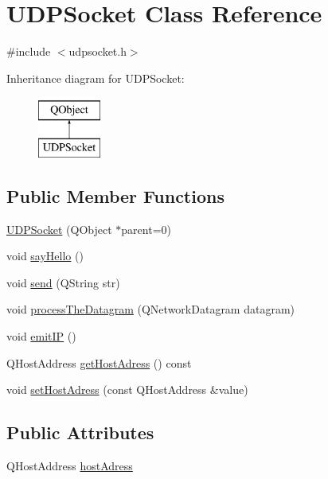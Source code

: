 \hypertarget{class_u_d_p_socket}{}\section{U\+D\+P\+Socket Class Reference}
\label{class_u_d_p_socket}


{\ttfamily \#include $<$udpsocket.\+h$>$}

Inheritance diagram for U\+D\+P\+Socket\+:\begin{figure}[H]
\begin{center}
\leavevmode
\includegraphics[height=2.000000cm]{class_u_d_p_socket}
\end{center}
\end{figure}
\subsection*{Public Member Functions}
\begin{DoxyCompactItemize}
\item 
\hyperlink{class_u_d_p_socket_a3d40509e1eb916df5ecbca4d3696c3d2}{U\+D\+P\+Socket} (Q\+Object $\ast$parent=0)
\item 
void \hyperlink{class_u_d_p_socket_a991e20366ed560c24402d7a6404daea7}{say\+Hello} ()
\item 
void \hyperlink{class_u_d_p_socket_a66a6c4663cc3084cb4d76583e8039083}{send} (Q\+String str)
\item 
void \hyperlink{class_u_d_p_socket_ad84c799182b7d7edafe956674ecb3faf}{process\+The\+Datagram} (Q\+Network\+Datagram datagram)
\item 
void \hyperlink{class_u_d_p_socket_a9cfc381ef8fe97d2adea9eb0d2c2c1f5}{emit\+IP} ()
\item 
Q\+Host\+Address \hyperlink{class_u_d_p_socket_a8d1b7ad860447197ac896f35949aa723}{get\+Host\+Adress} () const
\item 
void \hyperlink{class_u_d_p_socket_a5bdac3040e57d37c503fdd3293b6d053}{set\+Host\+Adress} (const Q\+Host\+Address \&value)
\end{DoxyCompactItemize}
\subsection*{Public Attributes}
\begin{DoxyCompactItemize}
\item 
Q\+Host\+Address \hyperlink{class_u_d_p_socket_aacd808913633488ab008e8aa7ff8d9cf}{host\+Adress}
\end{DoxyCompactItemize}
